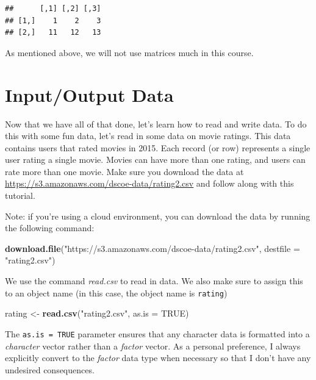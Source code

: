 \documentclass[]{book}
\newenvironment{Shaded}{\begin{snugshade}}{\end{snugshade}}
\newcommand{\KeywordTok}[1]{\textcolor[rgb]{0.13,0.29,0.53}{\textbf{{#1}}}}
\newcommand{\DataTypeTok}[1]{\textcolor[rgb]{0.13,0.29,0.53}{{#1}}}
\newcommand{\StringTok}[1]{\textcolor[rgb]{0.31,0.60,0.02}{{#1}}}
\newcommand{\OtherTok}[1]{\textcolor[rgb]{0.56,0.35,0.01}{{#1}}}
\newcommand{\NormalTok}[1]{{#1}}
\begin{document}
\begin{verbatim}
##      [,1] [,2] [,3]
## [1,]    1    2    3
## [2,]   11   12   13
\end{verbatim}

As mentioned above, we will not use matrices much in this course.

\section{Input/Output Data}\label{inputoutput-data}

Now that we have all of that done, let's learn how to read and write
data. To do this with some fun data, let's read in some data on movie
ratings. This data contains users that rated movies in 2015. Each record
(or row) represents a single user rating a single movie. Movies can have
more than one rating, and users can rate more than one movie. Make sure
you download the data at
\url{https://s3.amazonaws.com/dscoe-data/rating2.csv} and follow along
with this tutorial.

Note: if you're using a cloud environment, you can download the data by
running the following command:

\begin{Shaded}
\begin{Highlighting}[]
\KeywordTok{download.file}\NormalTok{(}\StringTok{"https://s3.amazonaws.com/dscoe-data/rating2.csv"}\NormalTok{, }\DataTypeTok{destfile =} \StringTok{"rating2.csv"}\NormalTok{)}
\end{Highlighting}
\end{Shaded}

We use the command \emph{read.csv} to read in data. We also make sure to
assign this to an object name (in this case, the object name is
\texttt{rating})

\begin{Shaded}
\begin{Highlighting}[]
\NormalTok{rating <-}\StringTok{ }\KeywordTok{read.csv}\NormalTok{(}\StringTok{"rating2.csv"}\NormalTok{, }\DataTypeTok{as.is =} \OtherTok{TRUE}\NormalTok{)}
\end{Highlighting}
\end{Shaded}

The \texttt{as.is\ =\ TRUE} parameter ensures that any character data is
formatted into a \emph{character} vector rather than a \emph{factor}
vector. As a personal preference, I always explicitly convert to the
\emph{factor} data type when necessary so that I don't have any
undesired consequences.
\end{document}
